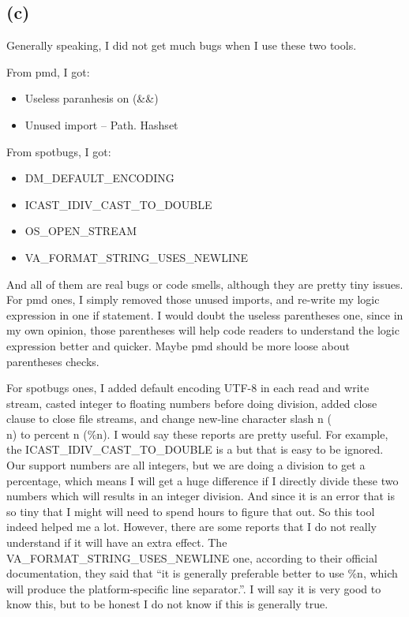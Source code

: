\documentclass[12pt]{article}
\begin{document}
\newpage
\subsection*{(c)}

Generally speaking, I did not get much bugs when I use these two tools. 

From pmd, I got:
\begin{itemize}
	\item Useless paranhesis on (\&\&)
	\item Unused import -- Path. Hashset
\end{itemize}

From spotbugs, I got:
\begin{itemize}
	\item DM\_DEFAULT\_ENCODING
	\item ICAST\_IDIV\_CAST\_TO\_DOUBLE
	\item OS\_OPEN\_STREAM
	\item VA\_FORMAT\_STRING\_USES\_NEWLINE
\end{itemize}

And all of them are real bugs or code smells, although they are pretty tiny issues. For pmd ones, I simply removed those unused imports, and re-write my logic expression in one if statement. I would doubt the useless parentheses one, since in my own opinion, those parentheses will help code readers to understand the logic expression better and quicker. Maybe pmd should be more loose about parentheses checks.

For spotbugs ones, I added default encoding UTF-8 in each read and write stream, casted integer to floating numbers before doing division, added close clause to close file streams, and change new-line character slash n (\\n) to percent n (\%n). I would say these reports are pretty useful. For example, the ICAST\_IDIV\_CAST\_TO\_DOUBLE is a but that is easy to be ignored. Our support numbers are all integers, but we are doing a division to get a percentage, which means I will get a huge difference if I directly divide these two numbers which will results in an integer division. And since it is an error that is so tiny that I might will need to spend hours to figure that out. So this tool indeed helped me a lot. However, there are some reports that I do not really understand if it will have an extra effect. The VA\_FORMAT\_STRING\_USES\_NEWLINE one, according to their official documentation, they said that ``it is generally preferable better to use \%n, which will produce the platform-specific line separator.''. I will say it is very good to know this, but to be honest I do not know if this is generally true. 
\end{document}
